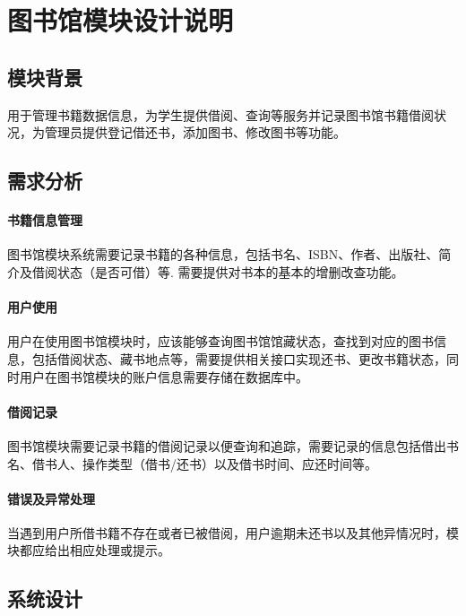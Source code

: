 \documentclass{article}
\begin{document}
\begin{enumerate}
{\begin{table}[H]
{\begin{tabular}{cccc}
         \hline
        \end{tabular}}
        \end{table}}
\end{enumerate}

\section{图书馆模块设计说明}
\subsection{模块背景}
用于管理书籍数据信息，为学生提供借阅、查询等服务并记录图书馆书籍借阅状况，为管理员提供登记借还书，添加图书、修改图书等功能。

\subsection{需求分析}

\paragraph{书籍信息管理}
图书馆模块系统需要记录书籍的各种信息，包括书名、ISBN、作者、出版社、简介及借阅状态（是否可借）等. 需要提供对书本的基本的增删改查功能。

\paragraph{用户使用}
用户在使用图书馆模块时，应该能够查询图书馆馆藏状态，查找到对应的图书信息，包括借阅状态、藏书地点等，需要提供相关接口实现还书、更改书籍状态，同时用户在图书馆模块的账户信息需要存储在数据库中。

\paragraph{借阅记录}
图书馆模块需要记录书籍的借阅记录以便查询和追踪，需要记录的信息包括借出书名、借书人、操作类型（借书/还书）以及借书时间、应还时间等。

\paragraph{错误及异常处理}
当遇到用户所借书籍不存在或者已被借阅，用户逾期未还书以及其他异情况时，模块都应给出相应处理或提示。

\subsection{系统设计}
\end{document}
